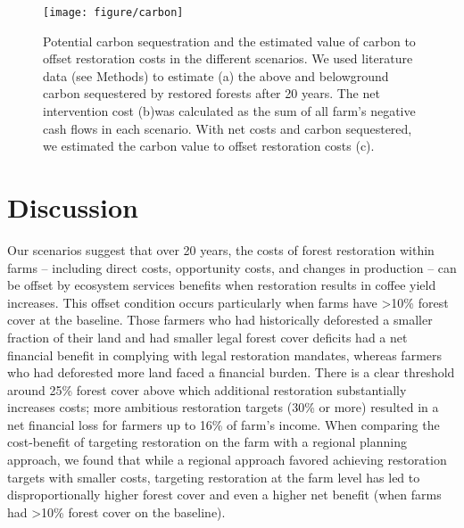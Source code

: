 \documentclass[
	12pt,				%
	oneside,			%
	a4paper,			%
	chapter=TITLE,		%
	section=TITLE,		%
	brazil,			%
	english				%
	]{abntex2}
\begin{document}
\begin{figure}[H]

{\centering \texttt{[image: figure/carbon]} 

}

\caption{Potential carbon sequestration and the estimated value of carbon to offset restoration costs in the different scenarios. We used literature data  (see Methods) to estimate (a) the above and belowground carbon sequestered by restored forests after 20 years.  The net intervention cost (b)was calculated as the sum of all farm’s negative cash flows in each scenario. With net costs and carbon sequestered, we estimated the carbon value to offset restoration costs (c).}\label{fig:fig6}
\end{figure}
\hypertarget{discussion-1}{%
\section{Discussion}\label{discussion-1}}

Our scenarios suggest that over 20 years, the costs of forest restoration within farms -- including direct costs, opportunity costs, and changes in production -- can be offset by ecosystem services benefits when restoration results in coffee yield increases. This offset condition occurs particularly when farms have \textgreater10\% forest cover at the baseline. Those farmers who had historically deforested a smaller fraction of their land and had smaller legal forest cover deficits had a net financial benefit in complying with legal restoration mandates, whereas farmers who had deforested more land faced a financial burden. There is a clear threshold around 25\% forest cover above which additional restoration substantially increases costs; more ambitious restoration targets (30\% or more) resulted in a net financial loss for farmers up to 16\% of farm's income. When comparing the cost-benefit of targeting restoration on the farm with a regional planning approach, we found that while a regional approach favored achieving restoration targets with smaller costs, targeting restoration at the farm level has led to disproportionally higher forest cover and even a higher net benefit (when farms had \textgreater10\% forest cover on the baseline).
\end{document}

